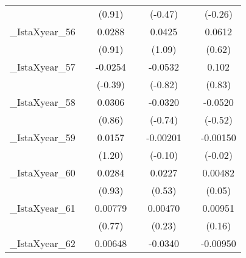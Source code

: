 {\begin{tabular}{l*{6}{c}}
            &                     &      (0.91)         &                     &     (-0.47)         &                     &     (-0.26)         \\
[1em]
\_IstaXyear\_56&                     &      0.0288         &                     &      0.0425         &                     &      0.0612         \\
            &                     &      (0.91)         &                     &      (1.09)         &                     &      (0.62)         \\
[1em]
\_IstaXyear\_57&                     &     -0.0254         &                     &     -0.0532         &                     &       0.102         \\
            &                     &     (-0.39)         &                     &     (-0.82)         &                     &      (0.83)         \\
[1em]
\_IstaXyear\_58&                     &      0.0306         &                     &     -0.0320         &                     &     -0.0520         \\
            &                     &      (0.86)         &                     &     (-0.74)         &                     &     (-0.52)         \\
[1em]
\_IstaXyear\_59&                     &      0.0157         &                     &    -0.00201         &                     &    -0.00150         \\
            &                     &      (1.20)         &                     &     (-0.10)         &                     &     (-0.02)         \\
[1em]
\_IstaXyear\_60&                     &      0.0284         &                     &      0.0227         &                     &     0.00482         \\
            &                     &      (0.93)         &                     &      (0.53)         &                     &      (0.05)         \\
[1em]
\_IstaXyear\_61&                     &     0.00779         &                     &     0.00470         &                     &     0.00951         \\
            &                     &      (0.77)         &                     &      (0.23)         &                     &      (0.16)         \\
[1em]
\_IstaXyear\_62&                     &     0.00648         &                     &     -0.0340         &                     &    -0.00950         \\

\end{tabular}}
